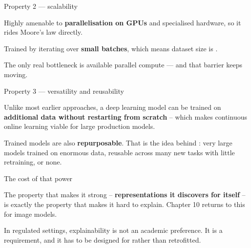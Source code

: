 \documentclass[aspectratio=169,11pt,t]{beamer}
\begin{document}
\begin{frame}[shrink=25]{Property 2 --- scalability}
\begin{ibullets}
\item Highly amenable to \textbf{parallelisation on GPUs} and specialised hardware, so it rides Moore's law directly.
\item Trained by iterating over \textbf{small batches}, which means dataset size is .
\item The only real bottleneck is available parallel compute --- and that barrier keeps moving.
\end{ibullets}
\end{frame}

\begin{frame}[shrink=25]{Property 3 --- versatility and reusability}
{\fontsize{9.4}{12.6}\selectfont\color{fg2}Unlike most earlier approaches, a deep learning model can be trained on \textbf{additional data without restarting from scratch} -- which makes continuous online learning viable for large production models.\par}\vskip 4pt
\begin{iband}[signal]
Trained models are also \textbf{repurposable}. That is the idea behind : very large models trained on enormous data, reusable across many new tasks with little retraining, or none.
\end{iband}
\end{frame}

\begin{frame}[shrink=25]{The cost of that power}
\begin{iband}[amber]
The property that makes it strong -- \textbf{representations it discovers for itself} -- is exactly the property that makes it hard to explain. Chapter 10 returns to this for image models.
\end{iband}
{\fontsize{9.4}{12.6}\selectfont\color{fg2}In regulated settings, explainability is not an academic preference. It is a requirement, and it has to be designed for rather than retrofitted.\par}\vskip 4pt
\end{frame}

\end{document}
